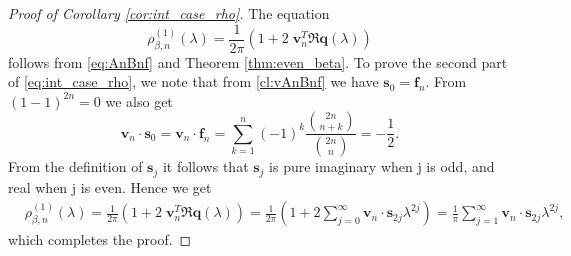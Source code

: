 \documentclass[12pt]{article}
\theoremstyle{definition} %
\theoremstyle{remark} %
\begin{document}
\begin{proof}[Proof of Corollary \ref{cor:int_case_rho}]
The equation 
\[
\rho^{(1)}_{\beta,n}(\lambda) =\frac{1}{2\pi}\left(1+2\;\mathbf{v}_n^T\Re \mathbf{q}(\lambda)\right)
\]
follows from \eqref{eq:AnBnf} and Theorem \ref{thm:even_beta}. To prove the second part of \eqref{eq:int_case_rho}, we note that from \eqref{cl:vAnBnf} we have $\mathbf{s}_0 = \mathbf{f}_n$. From $(1-1)^{2n} = 0$ we also get 
\[
\mathbf{v}_n \cdot \mathbf{s}_0 = \mathbf{v}_n \cdot \mathbf{f}_n = \sum_{k=1}^n (-1)^k \frac{\binom{2n}{n+k}}{\binom{2n}{n}} = -\frac{1}{2}.
\]
From the definition of $\mathbf{s}_j$ it follows that  $\mathbf{s}_j$ is pure imaginary when j is odd, and real when j is even. Hence we get
\begin{align*}
      &\rho^{(1)}_{\beta,n}(\lambda)  =\frac{1}{2\pi}\left(1+2\;\mathbf{v}_n^T\Re \mathbf{q}(\lambda)\right)=\frac{1}{2\pi}(1+ 2\sum_{j=0}^\infty \mathbf{v}_n\cdot \mathbf{s}_{2j} \lambda^{2j}) =\frac{1}{\pi} \sum_{j=1}^\infty \mathbf{v}_n\cdot \mathbf{s}_{2j} \lambda^{2j},
\end{align*}
which completes the proof. 
\end{proof}
\end{document}
